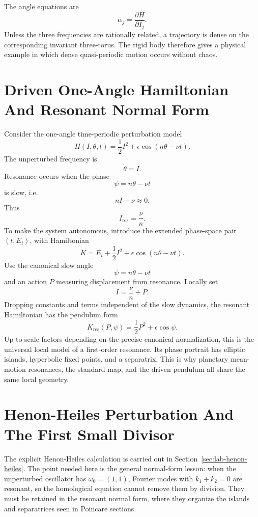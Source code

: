 The angle equations are
\[
  \dot\alpha_j=\frac{\partial H}{\partial I_j}.
\]
Unless the three frequencies are rationally related, a trajectory is dense on
the corresponding invariant three-torus. The rigid body therefore gives a
physical example in which dense quasi-periodic motion occurs without chaos.

\section{Driven One-Angle Hamiltonian And Resonant Normal Form}
\label{sec:detailed-driven-resonance}

Consider the one-angle time-periodic perturbation model
\[
  H(I,\theta,t)
  =
  \frac12I^2+\epsilon\cos(n\theta-\nu t).
\]
The unperturbed frequency is
\[
  \dot\theta=I.
\]
Resonance occurs when the phase
\[
  \psi=n\theta-\nu t
\]
is slow, i.e.
\[
  nI-\nu\approx0.
\]
Thus
\[
  I_{\mathrm{res}}=\frac{\nu}{n}.
\]
To make the system autonomous, introduce the extended phase-space pair
\((t,E_t)\), with Hamiltonian
\[
  K=E_t+\frac12I^2+\epsilon\cos(n\theta-\nu t).
\]
Use the canonical slow angle
\[
  \psi=n\theta-\nu t
\]
and an action \(P\) measuring displacement from resonance. Locally set
\[
  I=\frac{\nu}{n}+P.
\]
Dropping constants and terms independent of the slow dynamics, the resonant
Hamiltonian has the pendulum form
\[
  \boxed{
  K_{\mathrm{res}}(P,\psi)
  =
  \frac12P^2+\epsilon\cos\psi.
  }
\]
Up to scale factors depending on the precise canonical normalization, this is
the universal local model of a first-order resonance. Its phase portrait has
elliptic islands, hyperbolic fixed points, and a separatrix. This is why
planetary mean-motion resonances, the standard map, and the driven pendulum all
share the same local geometry.

\section{Henon-Heiles Perturbation And The First Small Divisor}
\label{sec:detailed-henon-small-divisor}

The explicit Henon-Heiles calculation is carried out in
Section~\ref{sec:lab-henon-heiles}. The point needed here is the general
normal-form lesson: when the unperturbed oscillator has
\(\omega_0=(1,1)\), Fourier modes with \(k_1+k_2=0\) are resonant, so the
homological equation cannot remove them by division. They must be retained in
the resonant normal form, where they organize the islands and separatrices seen
in Poincare sections.

